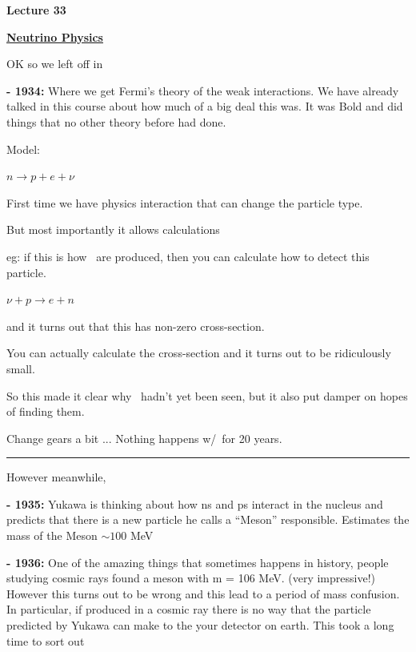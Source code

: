 \usepackage{fancyhdr}

\fancyhf{}


\thispagestyle{fancy}

\begin{center}
{\huge \textbf{Lecture 33}}
\end{center}

{\fontsize{14}{16}\selectfont

\textbf{\underline{Neutrino Physics}} 

OK so we left off in

\textbf{- 1934:} Where we get Fermi's theory of the weak interactions.  We have already talked in this course about how much of a big deal this was. 
It was Bold and did things that no other theory before had done. 

Model: 

\bc
$n \rightarrow p + e + \nu$
\ec

First time we have physics interaction that can change the particle type. 

But most importantly it allows calculations 

eg: if this is how \nus\ are produced, then you can calculate how to detect this particle. 

\bc
$\nu + p \rightarrow e + n$
\ec

and it turns out that this has non-zero cross-section. 

You can actually calculate the cross-section and it turns out to be ridiculously small.

So this made it clear why \nus\ hadn't yet been seen, but it also put damper on hopes of finding them. 



Change gears a bit ... Nothing happens w/\nus\ for 20 years.

\noindent\rule{\textwidth}{1pt}

However meanwhile, 

\textbf{- 1935:} Yukawa is thinking about how ns and ps interact in the nucleus and predicts that there is a new particle he calls a ``Meson'' responsible. 
Estimates the mass of the Meson $\sim 100$ MeV


\textbf{- 1936:} One of the amazing things that sometimes happens in history, people studying cosmic rays found a meson with m = 106 MeV. (very impressive!)
However this turns out to be wrong and this lead to a period of mass confusion.   
In particular, if produced in a cosmic ray there is no way that the particle predicted by Yukawa can make to the your detector on earth. 
This took a long time to sort out

}
